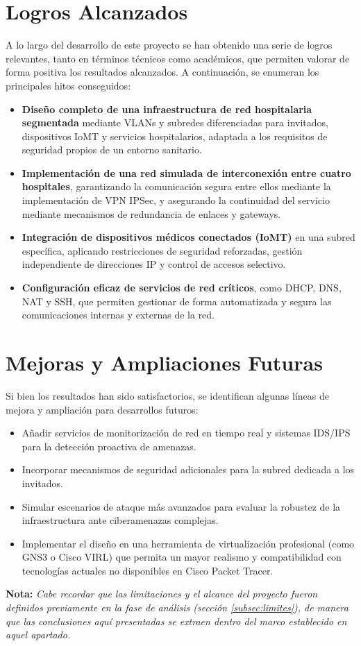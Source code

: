 \section{Logros Alcanzados}
A lo largo del desarrollo de este proyecto se han obtenido una serie de logros relevantes, tanto en términos técnicos como académicos, que permiten valorar de forma positiva 
los resultados alcanzados. A continuación, se enumeran los principales hitos conseguidos:
\begin{itemize}
    \item \textbf{Diseño completo de una infraestructura de red hospitalaria segmentada} mediante VLANs y subredes diferenciadas para invitados, dispositivos IoMT y servicios hospitalarios, adaptada a los requisitos de seguridad propios de un entorno sanitario.
    \item \textbf{Implementación de una red simulada de interconexión entre cuatro hospitales}, garantizando la comunicación segura entre ellos mediante la implementación de VPN IPSec, y asegurando la continuidad del servicio mediante mecanismos de redundancia de enlaces y gateways.
    \item \textbf{Integración de dispositivos médicos conectados (IoMT)} en una subred específica, aplicando restricciones de seguridad reforzadas, gestión independiente de direcciones IP y control de accesos selectivo.
    \item \textbf{Configuración eficaz de servicios de red críticos}, como DHCP, DNS, NAT y SSH, que permiten gestionar de forma automatizada y segura las comunicaciones internas y externas de la red.
\end{itemize}

\section{Mejoras y Ampliaciones Futuras}
Si bien los resultados han sido satisfactorios, se identifican algunas líneas de mejora y ampliación para desarrollos futuros:

\begin{itemize}
    \item Añadir servicios de monitorización de red en tiempo real y sistemas IDS/IPS para la detección proactiva de amenazas.
    \item Incorporar mecanismos de seguridad adicionales para la subred dedicada a los invitados.
    \item Simular escenarios de ataque más avanzados para evaluar la robustez de la infraestructura ante ciberamenazas complejas.
    \item Implementar el diseño en una herramienta de virtualización profesional (como GNS3 o Cisco VIRL) que permita un mayor realismo y 
    compatibilidad con tecnologías actuales no disponibles en Cisco Packet Tracer.
\end{itemize}

\small{\textbf{Nota:}\textit{ Cabe recordar que las limitaciones y el alcance del proyecto fueron definidos previamente en la fase de análisis (sección \ref{subsec:limites}), de manera que las conclusiones aquí presentadas se extraen dentro del marco establecido en aquel apartado.}}
